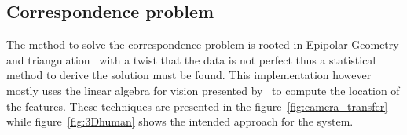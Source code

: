


\subsection{Correspondence problem}
The method to solve the correspondence problem is rooted in  Epipolar Geometry and triangulation~\cite{siciliano2010robotics} with a twist that the data is not perfect thus a statistical method to derive the solution must be found.
This implementation however mostly uses the linear algebra for vision presented by~\cite{corke2017robotics} to compute the location of the features.
These techniques are presented in the figure~\ref{fig:camera_transfer} while figure~\ref{fig:3Dhuman} shows the intended approach for the system.

